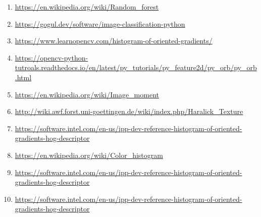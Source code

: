 \documentclass[12pt]{article}
\begin{document}
\begin{enumerate}
\item \url{https://en.wikipedia.org/wiki/Random\_forest}
\item \url{https://gogul.dev/software/image-classification-python}
\item \url{https://www.learnopencv.com/histogram-of-oriented-gradients/}
\item \url{https://opencv-python-tutroals.readthedocs.io/en/latest/py_tutorials/py_feature2d/py_orb/py_orb.html}
\item \url{https://en.wikipedia.org/wiki/Image_moment}
\item \url{http://wiki.awf.forst.uni-goettingen.de/wiki/index.php/Haralick_Texture}
\item \url{https://software.intel.com/en-us/ipp-dev-reference-histogram-of-oriented-gradients-hog-descriptor}
\item \url{https://en.wikipedia.org/wiki/Color_histogram}
\item \url{https://software.intel.com/en-us/ipp-dev-reference-histogram-of-oriented-gradients-hog-descriptor}
\item \url{https://software.intel.com/en-us/ipp-dev-reference-histogram-of-oriented-gradients-hog-descriptor}

\end{enumerate}
\end{document}
